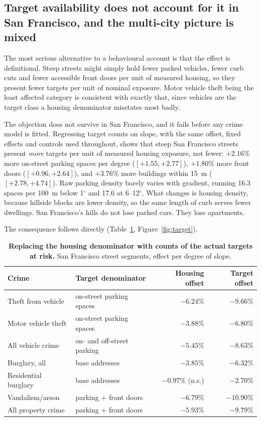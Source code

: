 \documentclass[12pt,letterpaper]{article}
\begin{document}
\subsection{Target availability does not account for it in San Francisco, and the multi-city picture is mixed}

The most serious alternative to a behavioural account is that the effect is
definitional. Steep streets might simply hold fewer parked vehicles, fewer curb cuts
and fewer accessible front doors per unit of measured housing, so they present fewer
targets per unit of nominal exposure. Motor vehicle theft being the least affected
category is consistent with exactly that, since vehicles are the target class a
housing denominator misstates most badly.

The objection does not survive in San Francisco, and it fails before any crime model
is fitted. Regressing target counts on
slope, with the same offset, fixed effects and controls used throughout, shows that
steep San Francisco streets present \emph{more} targets per unit of measured housing
exposure, not fewer: $+2.16\%$ more on-street parking spaces per degree
($[+1.55, +2.77]$), $+1.80\%$ more front doors ($[+0.96, +2.64]$), and $+3.76\%$ more
buildings within 15~m ($[+2.78, +4.74]$). Raw parking density barely varies with
gradient, running 16.3 spaces per 100~m below 1$^\circ$ and 17.6 at 6--12$^\circ$.
What changes is housing density, because hillside blocks are lower density, so the
same length of curb serves fewer dwellings. San Francisco's hills do not lose parked
cars. They lose apartments.

The consequence follows directly (Table~\ref{tab:target}, Figure~\ref{fig:target}).

\begin{table}[!ht]
\centering
\caption{{\bf Replacing the housing denominator with counts of the actual targets at
risk.} San Francisco street segments, effect per degree of slope.}
\label{tab:target}
\begin{tabular}{llrr}
\toprule
Crime & Target denominator & Housing offset & Target offset \\
\midrule
Theft from vehicle & on-street parking spaces & $-6.24\%$ & $-9.66\%$ \\
Motor vehicle theft & on-street parking spaces & $-3.88\%$ & $-6.80\%$ \\
All vehicle crime & on- and off-street parking & $-5.45\%$ & $-8.63\%$ \\
Burglary, all & base addresses & $-3.85\%$ & $-6.32\%$ \\
Residential burglary & base addresses & $-0.97\%$ (n.s.) & $-2.70\%$ \\
Vandalism/arson & parking + front doors & $-6.79\%$ & $-10.90\%$ \\
All property crime & parking + front doors & $-5.93\%$ & $-9.79\%$ \\
\bottomrule
\end{tabular}
\end{table}
\end{document}
